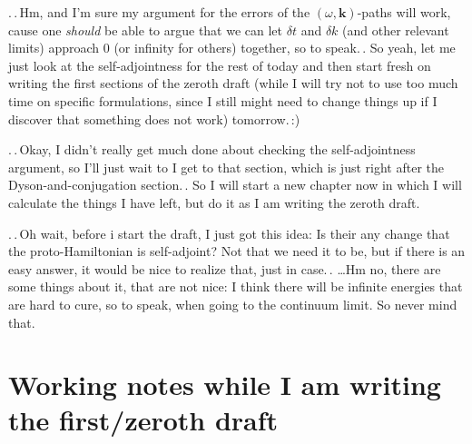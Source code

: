 \documentclass{report}
\begin{document}
.\,.\,Hm, and I'm sure my argument for the errors of the $(\omega, \boldsymbol{k})$-paths will work, cause one \emph{should} be able to argue that we can let $\delta t$ and $\delta k$ (and other relevant limits) approach 0 (or infinity for others) together, so to speak.\,. So yeah, let me just look at the self-adjointness for the rest of today and then start fresh on writing the first sections of the zeroth draft (while I will try not to use too much time on specific formulations, since I still might need to change things up if I discover that something does not work) tomorrow.\,:) %

.\,.\,Okay, I didn't really get much done about checking the self-adjointness argument, so I'll just wait to I get to that section, which is just right after the Dyson-and-conjugation section.\,. So I will start a new chapter now in which I will calculate the things I have left, but do it as I am writing the zeroth draft. 

.\,.\,Oh wait, before i start the draft, I just got this idea: Is their any change that the proto-Hamiltonian is self-adjoint? %
Not that we need it to be, but if there is an easy answer, it would be nice to realize that, just in case.\,. \ldots Hm no, there are some things about it, that are not nice: I think there will be infinite energies that are hard to cure, so to speak, when going to the continuum limit. So never mind that. 



\chapter{Working notes while I am writing the first/zeroth draft}
\end{document}
